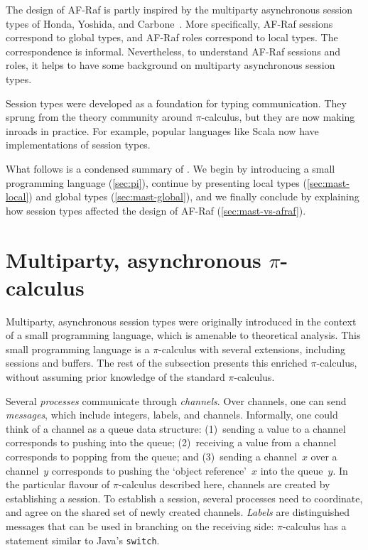 \documentclass[a4paper,12pt,oneside,fleqn]{book} %
\begin{document}
The design of AF-Raf is partly inspired
  by the multiparty asynchronous session types
  of Honda, Yoshida, and Carbone~\cite{DBLP:journals/jacm/HondaYC16}.
More specifically,
  AF-Raf sessions correspond to global types,
  and AF-Raf roles correspond to local types.
The correspondence is informal.
Nevertheless,
  to understand AF-Raf sessions and roles,
  it helps to have some background on multiparty asynchronous session types.

Session types were developed as a foundation for typing communication.
They sprung from the theory community around $\pi$-calculus,
  but they are now making inroads in practice.
For example, popular languages like Scala
  now have implementations of session types.

What follows is a condensed summary of \cite{DBLP:journals/jacm/HondaYC16}.
We begin by introducing a small programming language (\autoref{sec:pi}),
  continue by presenting
    local types (\autoref{sec:mast-local})
    and global types (\autoref{sec:mast-global}),
  and we finally conclude by explaining how session types affected the
    design of AF-Raf (\autoref{sec:mast-vs-afraf}).


\section{Multiparty, asynchronous $\pi$-calculus}
\label{sec:pi}

Multiparty, asynchronous session types were originally introduced
  in the context of a small programming language,
    which is amenable to theoretical analysis.
This small programming language
  is a $\pi$-calculus with several extensions,
  including sessions and buffers.
The rest of the subsection presents this enriched $\pi$-calculus,
  without assuming prior knowledge of the standard $\pi$-calculus.

Several \emph{processes} communicate through \emph{channels}.
Over channels, one can send \emph{messages},
  which include integers, labels, and channels.
Informally, one could think of a channel as a queue data structure:
(1)~sending a value to a channel corresponds to pushing into the queue;
(2)~receiving a value from a channel corresponds to popping from the queue;
and
(3)~sending a channel~$x$ over a channel~$y$ corresponds to
  pushing the `object reference'~$x$ into the queue~$y$.
In the particular flavour of $\pi$-calculus described here,
  channels are created by establishing a session.
To establish a session,
  several processes need to coordinate,
  and agree on the shared set of newly created channels.
\emph{Labels} are distinguished messages
  that can be used in branching on the receiving side:
  $\pi$-calculus has a statement similar to Java's {\tt switch}.
\end{document}
